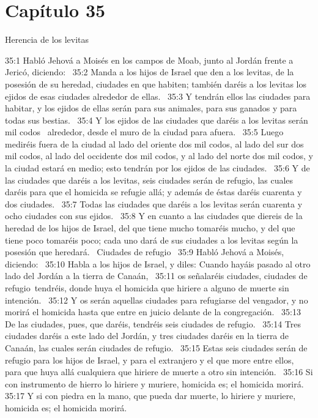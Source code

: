 \section*{Capítulo 35}
Herencia de los levitas  

35:1 Habló Jehová a Moisés en los campos de Moab, junto al Jordán frente a Jericó, diciendo:  
35:2 Manda a los hijos de Israel que den a los levitas, de la posesión de su heredad, ciudades en que habiten; también daréis a los levitas los ejidos de esas ciudades alrededor de ellas.  
35:3 Y tendrán ellos las ciudades para habitar, y los ejidos de ellas serán para sus animales, para sus ganados y para todas sus bestias.  
35:4 Y los ejidos de las ciudades que daréis a los levitas serán mil codos  alrededor, desde el muro de la ciudad para afuera.  
35:5 Luego mediréis fuera de la ciudad al lado del oriente dos mil codos, al lado del sur dos mil codos, al lado del occidente dos mil codos, y al lado del norte dos mil codos, y la ciudad estará en medio; esto tendrán por los ejidos de las ciudades.  
35:6 Y de las ciudades que daréis a los levitas, seis ciudades serán de refugio, las cuales daréis para que el homicida se refugie allá; y además de éstas daréis cuarenta y dos ciudades.  
35:7 Todas las ciudades que daréis a los levitas serán cuarenta y ocho ciudades con sus ejidos.  
35:8 Y en cuanto a las ciudades que diereis de la heredad de los hijos de Israel, del que tiene mucho tomaréis mucho, y del que tiene poco tomaréis poco; cada uno dará de sus ciudades a los levitas según la posesión que heredará.  
Ciudades de refugio   
35:9 Habló Jehová a Moisés, diciendo:  
35:10 Habla a los hijos de Israel, y diles: Cuando hayáis pasado al otro lado del Jordán a la tierra de Canaán,  
35:11 os señalaréis ciudades, ciudades de refugio tendréis, donde huya el homicida que hiriere a alguno de muerte sin intención.  
35:12 Y os serán aquellas ciudades para refugiarse del vengador, y no morirá el homicida hasta que entre en juicio delante de la congregación.  
35:13 De las ciudades, pues, que daréis, tendréis seis ciudades de refugio.  
35:14 Tres ciudades daréis a este lado del Jordán, y tres ciudades daréis en la tierra de Canaán, las cuales serán ciudades de refugio.  
35:15 Estas seis ciudades serán de refugio para los hijos de Israel, y para el extranjero y el que more entre ellos, para que huya allá cualquiera que hiriere de muerte a otro sin intención.  
35:16 Si con instrumento de hierro lo hiriere y muriere, homicida es; el homicida morirá.  
35:17 Y si con piedra en la mano, que pueda dar muerte, lo hiriere y muriere, homicida es; el homicida morirá.  

